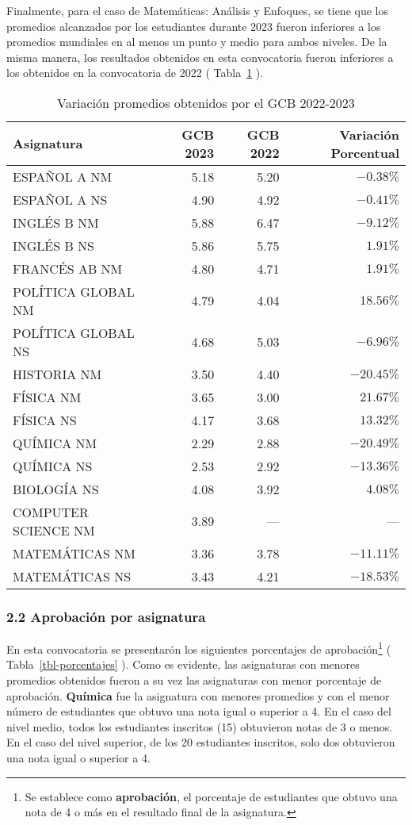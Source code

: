 \documentclass[
  letterpaper,
  DIV=11,
  numbers=noendperiod]{scrartcl}
\begin{document}
Finalmente, para el caso de Matemáticas: Análisis y Enfoques, se tiene
que los promedios alcanzados por los estudiantes durante 2023 fueron
inferiores a los promedios mundiales en al menos un punto y medio para
ambos niveles. De la misma manera, los resultados obtenidos en esta
convocatoria fueron inferiores a los obtenidos en la convocatoria de
2022 ( Tabla~\ref{tbl-variacion-promedios} ).

\hypertarget{tbl-variacion-promedios}{}
\begin{longtable}{lrrr}
\caption{\label{tbl-variacion-promedios}Variación promedios obtenidos por el GCB 2022-2023 }\tabularnewline

\toprule
Asignatura & GCB 2023 & GCB 2022 & Variación Porcentual \\ 
\midrule
ESPAÑOL A NM & 5.18 & 5.20 & $-0.38\%$ \\ 
ESPAÑOL A NS & 4.90 & 4.92 & $-0.41\%$ \\ 
INGLÉS B NM & 5.88 & 6.47 & $-9.12\%$ \\ 
INGLÉS B NS & 5.86 & 5.75 & $1.91\%$ \\ 
FRANCÉS AB NM & 4.80 & 4.71 & $1.91\%$ \\ 
POLÍTICA GLOBAL NM & 4.79 & 4.04 & $18.56\%$ \\ 
POLÍTICA GLOBAL NS & 4.68 & 5.03 & $-6.96\%$ \\ 
HISTORIA NM & 3.50 & 4.40 & $-20.45\%$ \\ 
FÍSICA NM & 3.65 & 3.00 & $21.67\%$ \\ 
FÍSICA NS & 4.17 & 3.68 & $13.32\%$ \\ 
QUÍMICA NM & 2.29 & 2.88 & $-20.49\%$ \\ 
QUÍMICA NS & 2.53 & 2.92 & $-13.36\%$ \\ 
BIOLOGÍA NS & 4.08 & 3.92 & $4.08\%$ \\ 
COMPUTER SCIENCE NM & 3.89 & — & — \\ 
MATEMÁTICAS NM & 3.36 & 3.78 & $-11.11\%$ \\ 
MATEMÁTICAS NS & 3.43 & 4.21 & $-18.53\%$ \\ 
\bottomrule
\end{longtable}

\hypertarget{aprobaciuxf3n-por-asignatura}{%
\subsubsection{2.2 Aprobación por
asignatura}\label{aprobaciuxf3n-por-asignatura}}

En esta convocatoria se presentarón los siguientes porcentajes de
aprobación\footnote{Se establece como \textbf{aprobación}, el porcentaje
  de estudiantes que obtuvo una nota de 4 o más en el resultado final de
  la asignatura.} ( Tabla~\ref{tbl-porcentajes} ). Como es evidente, las
asignaturas con menores promedios obtenidos fueron a su vez las
asignaturas con menor porcentaje de aprobación. \textbf{Química} fue la
asignatura con menores promedios y con el menor número de estudiantes
que obtuvo una nota igual o superior a 4. En el caso del nivel medio,
todos los estudiantes inscritos (15) obtuvieron notas de 3 o menos. En
el caso del nivel superior, de los 20 estudiantes inscritos, solo dos
obtuvieron una nota igual o superior a 4.
\end{document}
